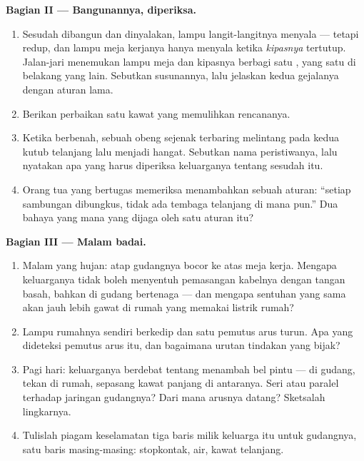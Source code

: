 \begin{problem}
\medskip\noindent\textbf{Bagian II --- Bangunannya, diperiksa.}
\begin{enumerate}[resume]
  \item Sesudah dibangun dan dinyalakan, lampu langit-langitnya
        menyala --- tetapi redup, dan lampu meja kerjanya hanya
        menyala ketika  \emph{kipasnya} tertutup. Jalan-jari
        menemukan lampu meja dan kipasnya berbagi satu , yang
        satu di belakang yang lain. Sebutkan susunannya, lalu
        jelaskan kedua gejalanya dengan aturan lama.
  \item Berikan perbaikan satu kawat yang memulihkan rencananya.
  \item Ketika berbenah, sebuah obeng sejenak terbaring melintang
        pada kedua kutub telanjang  lalu menjadi hangat.
        Sebutkan nama peristiwanya, lalu nyatakan apa yang harus
        diperiksa keluarganya tentang  sesudah itu.
  \item Orang tua yang bertugas memeriksa menambahkan sebuah aturan:
        ``setiap sambungan dibungkus, tidak ada tembaga telanjang di
        mana pun.'' Dua bahaya yang mana yang dijaga oleh satu
        aturan itu?
\end{enumerate}

\medskip\noindent\textbf{Bagian III --- Malam badai.}
\begin{enumerate}[resume]
  \item Malam yang hujan: atap gudangnya bocor ke atas meja kerja.
        Mengapa keluarganya tidak boleh menyentuh pemasangan
        kabelnya dengan tangan basah, bahkan di gudang bertenaga
         --- dan mengapa sentuhan yang sama akan jauh lebih
        gawat di rumah yang memakai listrik rumah?
  \item Lampu rumahnya sendiri berkedip dan satu pemutus arus turun.
        Apa yang dideteksi pemutus arus itu, dan bagaimana urutan
        tindakan yang bijak?
  \item Pagi hari: keluarganya berdebat tentang menambah bel pintu
        ---  di gudang,  tekan di rumah, sepasang
        kawat panjang di antaranya. Seri atau paralel terhadap
        jaringan gudangnya? Dari mana arusnya datang? Sketsalah
        lingkarnya.
  \item Tulislah piagam keselamatan tiga baris milik keluarga itu
        untuk gudangnya, satu baris masing-masing: stopkontak, air,
        kawat telanjang.
\end{enumerate}
\end{problem}
